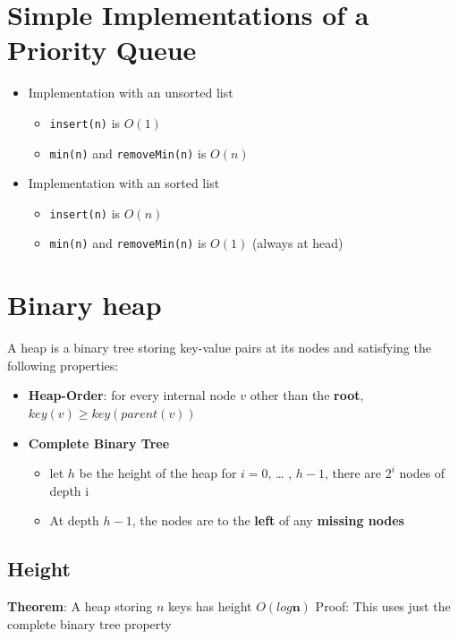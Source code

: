 \documentclass{article}
\begin{document}
\section{Simple Implementations of a Priority Queue}
\begin{itemize}
	\item Implementation with an unsorted list
	\begin{itemize}
		\item \texttt{insert(n)} is $O(1)$
		\item \texttt{min(n)} and \texttt{removeMin(n)} is $O(n)$ 
	\end{itemize}
	\item Implementation with an sorted list
	\begin{itemize}
		\item \texttt{insert(n)} is $O(n)$
		\item \texttt{min(n)} and \texttt{removeMin(n)} is $O(1)$ (always at head)
	\end{itemize}
\end{itemize}

\section{Binary heap}
\begin{flushleft}
A heap is a binary tree storing key-value pairs at its nodes and satisfying the following properties:
\begin{itemize}
	\item \textbf{Heap-Order}: for every internal node $v$ other than the \textbf{root}, $key(v) \geq key(parent(v))$
	\item \textbf{Complete Binary Tree}
	\begin{itemize}
		\item let $h$ be the height of the heap for $i = 0$, … , $h - 1$, there are $2^i$ nodes of depth i
		\item At depth $h - 1$, the nodes are to the \textbf{left} of any \textbf{missing nodes}
	\end{itemize}
\end{itemize}
\end{flushleft}

\subsection{Height}
\begin{flushleft}
\textbf{Theorem}: A heap storing $n$ keys has height $O(log \mathbf{n})$ Proof: This uses just the complete binary tree property
\end{flushleft}
\end{document}
